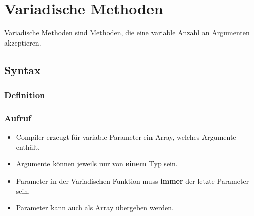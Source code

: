 \section{Variadische Methoden}
Variadische Methoden sind Methoden, die eine variable Anzahl an Argumenten akzeptieren.
\subsection{Syntax}
\vspace{-0.8\abovedisplayskip}
\begin{minipage}[t]{0.49\columnwidth}
    \subsubsection{Definition}
    
\end{minipage}\hfill
\begin{minipage}[t]{0.49\columnwidth}
    \subsubsection{Aufruf}
    
\end{minipage}
\begin{itemize}
    \item Compiler erzeugt für variable Parameter ein Array, welches Argumente enthält.
    \item Argumente können jeweils nur von \textbf{einem} Typ sein.
    \item Parameter in der Variadischen Funktion muss \textbf{immer} der letzte Parameter sein.
    \item Parameter kann auch als Array übergeben werden.
\end{itemize}